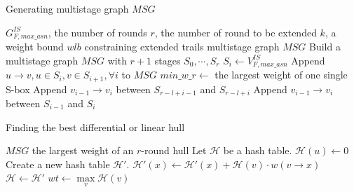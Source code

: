 \begin{algorithm}
	\caption{Generating multistage graph $MSG$}
	\label{algo:3}
	\begin{algorithmic}[1]
		\Require $G^{IS}_{F,max\_asn}$, the number of rounds $r$, the number of round to be extended $k$, a weight bound $wlb$ constraining extended trails
		\Ensure multistage graph $MSG$
		\Procedure {}{}
		\State Build a multistage graph $MSG$ with $r+1$ stages $S_0,\cdots,S_r$
		\State $S_i\leftarrow V^{IS}_{F,max\_asn}$
		\EndFor
		\State Append $u\rightarrow v, u\in S_i,v\in S_{i+1}, \forall i$ to $MSG$
		\EndFor
		\State $min\_w\_r\leftarrow$ the largest weight of one single S-box
		\State Append $v_{i-1}\rightarrow v_i$ between $S_{r-l+i-1}$ and $S_{r-l+i}$
		\EndFor
		\State Append $v_{i-1}\rightarrow v_i$ between $S_{i-1}$ and $S_{i}$
		\EndFor
		\EndIf
		\EndFor
		\EndProcedure
	\end{algorithmic}
\end{algorithm}

\begin{algorithm}
	\caption{Finding the best differential or linear hull}
	\label{algo:4}
	\begin{algorithmic}[1]
		\Require $MSG$
		\Ensure the largest weight of an $r$-round hull
		\Procedure {}{}
		\State Let $\mathcal{H}$ be a hash table. 
		\State $\mathcal{H}(u)\leftarrow 0$
		\State Create a new hash table $\mathcal{H}'$. 
		\State $\mathcal{H}'(x)\leftarrow \mathcal{H}'(x)+\mathcal{H}(v)\cdot w(v\rightarrow x)$
		\EndFor
		\EndFor
		\State $\mathcal{H}\leftarrow \mathcal{H}'$
		\EndFor
		\State $wt\leftarrow \max\limits_{v}\mathcal{H}(v)$
		\EndIf
		\EndFor
		\State {}
		\EndProcedure
	\end{algorithmic}
\end{algorithm}



